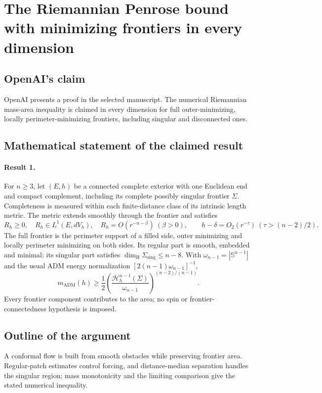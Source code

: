 \documentclass[11pt]{article}
\begin{document}
\section*{The Riemannian Penrose bound with minimizing frontiers in every dimension}

\subsection{OpenAI's claim}
OpenAI presents a proof in the selected manuscript. The numerical Riemannian mass-area inequality is claimed in every dimension for full outer-minimizing, locally perimeter-minimizing frontiers, including singular and disconnected ones.

\subsection{Mathematical statement of the claimed result}
\paragraph{Result 1.} For $n\ge3$, let $(E,h)$ be a connected complete exterior with one Euclidean end and compact complement, including its complete possibly singular frontier $\Sigma$. Completeness is measured within each finite-distance class of its intrinsic length metric. The metric extends smoothly through the frontier and satisfies
\[
 R_h\ge0,\quad R_h\in L^1(E,dV_h),\quad R_h=O(r^{-n-\beta})\ (\beta>0),\qquad
 h-\delta=O_2(r^{-\tau})\ (\tau>(n-2)/2).
\]
The full frontier is the perimeter support of a filled side, outer minimizing and locally perimeter minimizing on both sides. Its regular part is smooth, embedded and minimal; its singular part satisfies $\dim_{\mathrm H}\Sigma_{\mathrm{sing}}\le n-8$. With $\omega_{n-1}=|\mathbb S^{n-1}|$ and the usual ADM energy normalization $[2(n-1)\omega_{n-1}]^{-1}$,
\[
 m_{\mathrm{ADM}}(h)\ge\frac12\left(\frac{\mathcal H_h^{n-1}(\Sigma)}{\omega_{n-1}}\right)^{(n-2)/(n-1)}.
\]
Every frontier component contributes to the area; no spin or frontier-connectedness hypothesis is imposed.

\subsection{Outline of the argument}
A conformal flow is built from smooth obstacles while preserving frontier area. Regular-patch estimates control forcing, and distance-median separation handles the singular region; mass monotonicity and the limiting comparison give the stated numerical inequality.
\end{document}
